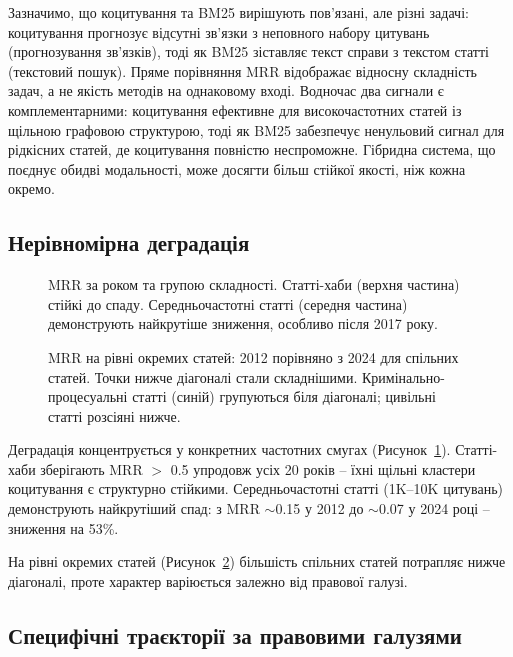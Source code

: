 \documentclass[11pt]{article}
\begin{document}
Зазначимо, що коцитування та BM25 вирішують пов'язані, але різні задачі: коцитування прогнозує відсутні зв'язки з неповного набору цитувань (прогнозування зв'язків), тоді як BM25 зіставляє текст справи з текстом статті (текстовий пошук).
Пряме порівняння MRR відображає відносну складність задач, а не якість методів на однаковому вході.
Водночас два сигнали є комплементарними: коцитування ефективне для високочастотних статей із щільною графовою структурою, тоді як BM25 забезпечує ненульовий сигнал для рідкісних статей, де коцитування повністю неспроможне.
Гібридна система, що поєднує обидві модальності, може досягти більш стійкої якості, ніж кожна окремо.

\subsection{Нерівномірна деградація}

\begin{figure}[t]
\centering

\caption{MRR за роком та групою складності. Статті-хаби (верхня частина) стійкі до спаду. Середньочастотні статті (середня частина) демонструють найкрутіше зниження, особливо після 2017 року.}
\label{fig:heatmap_temporal}
\end{figure}

\begin{figure}[t]
\centering

\caption{MRR на рівні окремих статей: 2012 порівняно з 2024 для спільних статей. Точки нижче діагоналі стали складнішими. Кримінально-процесуальні статті (синій) групуються біля діагоналі; цивільні статті розсіяні нижче.}
\label{fig:stability}
\end{figure}

Деградація концентрується у конкретних частотних смугах (Рисунок~\ref{fig:heatmap_temporal}).
Статті-хаби зберігають MRR $>$ 0.5 упродовж усіх 20 років -- їхні щільні кластери коцитування є структурно стійкими.
Середньочастотні статті (1K--10K цитувань) демонструють найкрутіший спад: з MRR $\sim$0.15 у 2012 до $\sim$0.07 у 2024 році -- зниження на 53\%.

На рівні окремих статей (Рисунок~\ref{fig:stability}) більшість спільних статей потрапляє нижче діагоналі, проте характер варіюється залежно від правової галузі.

\subsection{Специфічні траєкторії за правовими галузями}
\end{document}
